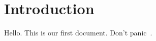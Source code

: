\documentclass[11pt]{article}
\begin{document}
    \section{Introduction}\label{sec:introduction}

    Hello.
    This is our first document.
    Don't panic~\cite{adams1995hitchhiker}.


    
    
\end{document}
